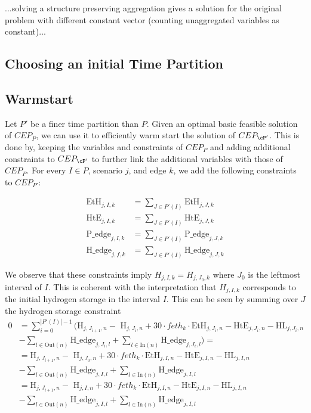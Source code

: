 \documentclass[english]{article}
\numberwithin{definition}{section}
\numberwithin{theorem}{section}
\numberwithin{problem}{section}
\begin{document}
...solving a structure preserving aggregation gives a solution for the original problem with different constant vector (counting unaggregated variables as constant)...




\subsection{Choosing an initial Time Partition}
\subsection{Warmstart}
Let \(P'\) be a finer time partition than \(P\). Given an optimal basic feasible solution of \(CEP_{P}\), we can use it to efficiently warm start the solution of \(CEP_{\cP'}\). This is done by, keeping the variables and constraints of \(CEP_{P}\) and adding additional constraints to \(CEP_{\cP'}\) to further link the additional variables with those of \(CEP_{P}\). For every \(I \in P\), scenario \(j\), and edge \(k\), we add the following constraints to \(CEP_{P'}\):

\begin{align*}
  \text{EtH}_{j,I,k} &= \sum_{J \in P'(I)} \text{EtH}_{j,J,k} \\
  \text{HtE}_{j,I,k} &= \sum_{J \in P'(I)} \text{HtE}_{j,J,k} \\
  \text{P\_edge}_{j,I,k} &= \sum_{J \in P'(I)} \text{P\_edge}_{j,J,k} \\
  \text{H\_edge}_{j,f,k} &= \sum_{J \in P'(I)} \text{H\_edge}_{j,J,k}
\end{align*}

We observe that these constraints imply \(H_{j,I,k} = H_{j,J_0,k}\) where \(J_0\) is the leftmost interval of \(I\). This is coherent with the interpretation that \(H_{j,I,k}\) corresponds to the initial hydrogen storage in the interval \(I\). This can be seen by summing over \(J\) the hydrogen storage constraint %
\begin{align*}
 0 & = \sum_{i=0}^{|P'(I)|-1}\bigl(\text{H}_{j,J_{i+1},n}  - \text{ H}_{j,J_{i},n} + 30 \cdot feth_k \cdot \text{EtH}_{j,J_{i},n} - \text{HtE}_{j,J_{i},n} - \text{HL}_{j,J_{i},n} \\
&- \sum_{l \in \text{Out}(n)} \text{H\_edge}_{j,J_{i},l}  + \sum_{l \in \text{In}(n)} \text{H\_edge}_{j,J_{i},l} \bigr) =  \\  
&=   \text{H}_{j,J_{i+1},n}  - \text{ H}_{j,J_{0},n} + 30 \cdot feth_k \cdot \text{EtH}_{j,I,n} - \text{HtE}_{j,I,n} - \text{HL}_{j,I,n}  \\ 
&-\sum_{l \in \text{Out}(n)} \text{H\_edge}_{j,I,l}  + \sum_{l \in \text{In}(n)} \text{H\_edge}_{j,I,l} \\ 
&= \text{H}_{j,J_{i+1},n}  - \text{ H}_{j,I, n} + 30 \cdot feth_k \cdot \text{EtH}_{j,I,n} - \text{HtE}_{j,I,n} - \text{HL}_{j,I,n} \\
&- \sum_{l \in \text{Out}(n)} \text{H\_edge}_{j,I,l}  + \sum_{l \in \text{In}(n)} \text{H\_edge}_{j,I,l}
\end{align*}
\end{document}
